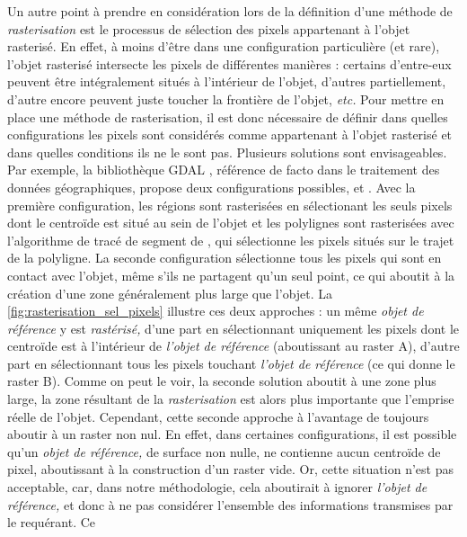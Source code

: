 Un autre point à prendre en considération lors de la définition d'une
méthode de \emph{rasterisation} est le processus de sélection des
pixels appartenant à l'objet rasterisé. En effet, à moins d’être dans
une configuration particulière (et rare), l'objet rasterisé intersecte
les pixels de différentes manières : certains d'entre-eux peuvent être
intégralement situés à l'intérieur de l'objet, d'autres partiellement,
d'autre encore peuvent juste toucher la frontière de l'objet,
\emph{etc.} Pour mettre en place une méthode de rasterisation, il est
donc nécessaire de définir dans quelles configurations les pixels sont
considérés comme appartenant à l'objet rasterisé et dans quelles
conditions ils ne le sont pas. Plusieurs solutions sont
envisageables. Par exemple, la bibliothèque GDAL \autocite{GDAL2020},
référence de facto dans le traitement des données géographiques,
propose deux configurations possibles,
 et
. Avec la première
configuration, les régions sont rasterisées en sélectionant les seuls
pixels dont le centroïde est situé au sein de l'objet et les
polylignes sont rasterisées avec l'algorithme de tracé de segment de
\textcite{Bresenham1965}, qui sélectionne les pixels situés sur le
trajet de la polyligne. La seconde configuration sélectionne tous les
pixels qui sont en contact avec l'objet, même s'ils ne partagent qu'un
seul point, ce qui aboutit à la création d'une zone généralement plus
large que l'objet. La \autoref{fig:rasterisation_sel_pixels} illustre
ces deux approches : un même \emph{objet de référence} y est
\emph{rastérisé,} d'une part en sélectionnant uniquement les pixels
dont le centroïde est à l'intérieur de \emph{l'objet de référence}
(aboutissant au raster \textcolor{RdBu-9-1}{\textsf{A}}), d'autre part
en sélectionnant tous les pixels touchant \emph{l'objet de référence}
(ce qui donne le raster \textcolor{RdBu-9-9}{\textsf{B}}). Comme on
peut le voir, la seconde solution aboutit à une zone plus large, la
zone résultant de la \emph{rasterisation} est alors plus importante
que l'emprise réelle de l'objet. Cependant, cette seconde approche à
l'avantage de toujours aboutir à un raster non nul. En effet, dans
certaines configurations, il est possible qu'un \emph{objet de
  référence,} de surface non nulle, ne contienne aucun centroïde de
pixel, aboutissant à la construction d'un raster vide. Or, cette
situation n'est pas acceptable, car, dans notre méthodologie, cela
aboutirait à ignorer \emph{l'objet de référence,} et donc à ne pas
considérer l'ensemble des informations transmises par le requérant. Ce
